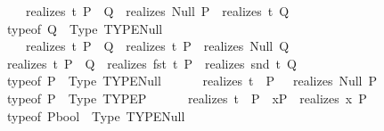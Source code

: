 \begin{isabellebody}
\ \ \ \ \ {\isacharparenleft}{\kern0pt}realizes\ t\ {\isacharparenleft}{\kern0pt}P\ {\isasymand}\ Q{\isacharparenright}{\kern0pt}{\isacharparenright}{\kern0pt}\ {\isasymequiv}\ {\isacharparenleft}{\kern0pt}realizes\ Null\ P\ {\isasymand}\ realizes\ t\ Q{\isacharparenright}{\kern0pt}{\isachardoublequoteclose}\isanewline
\isanewline
\ \ {\isachardoublequoteopen}{\isacharparenleft}{\kern0pt}typeof\ Q{\isacharparenright}{\kern0pt}\ {\isasymequiv}\ {\isacharparenleft}{\kern0pt}Type\ {\isacharparenleft}{\kern0pt}TYPE{\isacharparenleft}{\kern0pt}Null{\isacharparenright}{\kern0pt}{\isacharparenright}{\kern0pt}{\isacharparenright}{\kern0pt}\ {\isasymLongrightarrow}\isanewline
\ \ \ \ \ {\isacharparenleft}{\kern0pt}realizes\ t\ {\isacharparenleft}{\kern0pt}P\ {\isasymand}\ Q{\isacharparenright}{\kern0pt}{\isacharparenright}{\kern0pt}\ {\isasymequiv}\ {\isacharparenleft}{\kern0pt}realizes\ t\ P\ {\isasymand}\ realizes\ Null\ Q{\isacharparenright}{\kern0pt}{\isachardoublequoteclose}\isanewline
\isanewline
\ \ {\isachardoublequoteopen}{\isacharparenleft}{\kern0pt}realizes\ t\ {\isacharparenleft}{\kern0pt}P\ {\isasymand}\ Q{\isacharparenright}{\kern0pt}{\isacharparenright}{\kern0pt}\ {\isasymequiv}\ {\isacharparenleft}{\kern0pt}realizes\ {\isacharparenleft}{\kern0pt}fst\ t{\isacharparenright}{\kern0pt}\ P\ {\isasymand}\ realizes\ {\isacharparenleft}{\kern0pt}snd\ t{\isacharparenright}{\kern0pt}\ Q{\isacharparenright}{\kern0pt}{\isachardoublequoteclose}\isanewline
\isanewline
\ \ {\isachardoublequoteopen}typeof\ P\ {\isasymequiv}\ Type\ {\isacharparenleft}{\kern0pt}TYPE{\isacharparenleft}{\kern0pt}Null{\isacharparenright}{\kern0pt}{\isacharparenright}{\kern0pt}\ {\isasymLongrightarrow}\isanewline
\ \ \ \ \ realizes\ t\ {\isacharparenleft}{\kern0pt}{\isasymnot}\ P{\isacharparenright}{\kern0pt}\ {\isasymequiv}\ {\isasymnot}\ realizes\ Null\ P{\isachardoublequoteclose}\isanewline
\isanewline
\ \ {\isachardoublequoteopen}typeof\ P\ {\isasymequiv}\ Type\ {\isacharparenleft}{\kern0pt}TYPE{\isacharparenleft}{\kern0pt}{\isacharprime}{\kern0pt}P{\isacharparenright}{\kern0pt}{\isacharparenright}{\kern0pt}\ {\isasymLongrightarrow}\isanewline
\ \ \ \ \ realizes\ t\ {\isacharparenleft}{\kern0pt}{\isasymnot}\ P{\isacharparenright}{\kern0pt}\ {\isasymequiv}\ {\isacharparenleft}{\kern0pt}{\isasymforall}x{\isacharcolon}{\kern0pt}{\isacharcolon}{\kern0pt}{\isacharprime}{\kern0pt}P{\isachardot}{\kern0pt}\ {\isasymnot}\ realizes\ x\ P{\isacharparenright}{\kern0pt}{\isachardoublequoteclose}\isanewline
\isanewline
\ \ {\isachardoublequoteopen}typeof\ {\isacharparenleft}{\kern0pt}P{\isacharcolon}{\kern0pt}{\isacharcolon}{\kern0pt}bool{\isacharparenright}{\kern0pt}\ {\isasymequiv}\ Type\ {\isacharparenleft}{\kern0pt}TYPE{\isacharparenleft}{\kern0pt}Null{\isacharparenright}{\kern0pt}{\isacharparenright}{\kern0pt}\ {\isasymLongrightarrow}\isanewline

\end{isabellebody}
